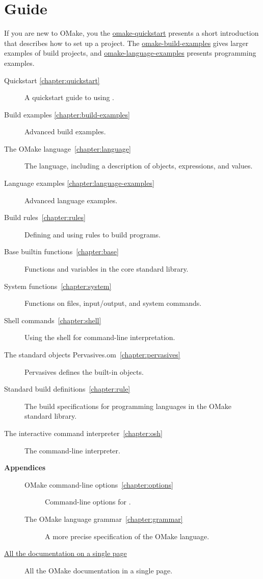%
\chapter{Guide}
\label{chapter:omake}
\label{section:guide}

If you are new to OMake, you the \href{omake-quickstart.html}{omake-quickstart} presents a short
introduction that describes how to set up a project.  The
\href{omake-build-examples.html}{omake-build-examples} gives larger examples of build projects, and
\href{omake-language-examples.html}{omake-language-examples} presents programming examples.

\begin{description}
\item[Quickstart \ref{chapter:quickstart}]
%
   A quickstart guide to using .
\item[Build examples \ref{chapter:build-examples}]
%
   Advanced build examples.
\item[The OMake language~\ref{chapter:language}]
%
   The  language, including a description of objects, expressions, and values.
\item[Language examples \ref{chapter:language-examples}]
%
   Advanced language examples.
\item[Build rules~\ref{chapter:rules}]
%
   Defining and using rules to build programs.
\item[Base builtin functions~\ref{chapter:base}]
%
   Functions and variables in the core standard library.
\item[System functions~\ref{chapter:system}]
%
   Functions on files, input/output, and system commands.
\item[Shell commands~\ref{chapter:shell}]
%
   Using the  shell for command-line interpretation.
\item[The standard objects Pervasives.om~\ref{chapter:pervasives}]
%
   Pervasives defines the built-in objects.
\item[Standard build definitions~\ref{chapter:rule}]
%
   The build specifications for programming languages in the OMake standard library.
\item[The interactive command interpreter~\ref{chapter:osh}]
%
   The  command-line interpreter.
\item[\textbf{Appendices}]
\begin{description}
\item[OMake command-line options~\ref{chapter:options}]
%
   Command-line options for .
%
\item[The OMake language grammar~\ref{chapter:grammar}]
%
   A more precise specification of the OMake language.
\end{description}
\item[\href{omake-doc.html}{All the documentation on a single page}]
%
   All the OMake documentation in a single page.
\end{description}

